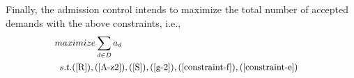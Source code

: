 \documentclass[sigconf]{acmart}
\begin{document}
\begin{appendices}
Finally, the admission control intends to maximize the total number of accepted demands
with the above constraints, i.e., 
%
\begin{equation}
\small
\begin{aligned} \label{P8}
 &maximize  \sum_{d\in D} a_d\\
&\begin{array}{r@{\quad}r@{}l@{\quad}l}
s.t.
(\ref{R}), (\ref{A-z2}), (\ref{S}), (\ref{g-2}), (\ref{constraint-f}), (\ref{constraint-e})
\end{array}
\end{aligned}
\end{equation}


\end{appendices}
\end{document}
